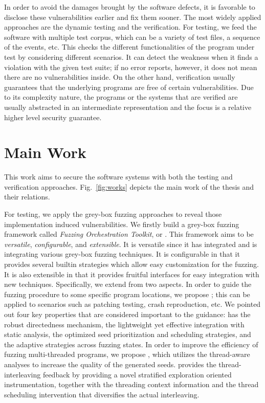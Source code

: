 In order to avoid the damages brought by the software defects, it is favorable to disclose these vulnerabilities earlier and fix them sooner. The most widely applied approaches are the dynamic testing and the verification. For testing, we feed the software with multiple test corpus, which can be a variety of test files, a sequence of the events, etc. This checks the different functionalities of the program under test by considering different scenarios. It can detect the weakness when it finds a violation with the given test suite; if no error reports, however, it does not mean there are no vulnerabilities inside. On the other hand, verification usually guarantees that the underlying programs are free of certain vulnerabilities. Due to its complexity nature, the programs or the systems that are verified are usually abstracted in an intermediate representation and the focus is a relative higher level security guarantee.

\section{Main Work}

This work aims to secure the software systems with both the testing and verification approaches. Fig.~\ref{fig:works} depicts the main work of the thesis and their relations.

For testing, we apply the grey-box fuzzing approaches to reveal those implementation induced vulnerabilities. We firstly build a grey-box fuzzing framework called \emph{Fuzzing Orchestration Toolkit}, or \FOT. This framework aims to be \emph{versatile}, \emph{configurable}, and \emph{extensible}. It is versatile since it has integrated and is integrating various grey-box fuzzing techniques. It is configurable in that it provides several builtin strategies which allow easy customization for the fuzzing. It is also extensible in that it provides fruitful interfaces for easy integration with new techniques. Specifically, we extend \FOT from two aspects. In order to guide the fuzzing procedure to some specific program locations, we propose \dFOT; this can be applied to scenarios such as patching testing, crash reproduction, etc. We pointed out four key properties that are considered important to the guidance: \dFOT has the robust directedness mechanism, the lightweight yet effective integration with static analysis, the optimized seed prioritization and scheduling strategies, and the adaptive strategies across fuzzing states. In order to improve the efficiency of fuzzing multi-threaded programs, we propose \mtfuzz, which utilizes the thread-aware analyses to increase the quality of the generated seeds. \mtfuzz provides the thread-interleaving feedback by providing a novel stratified exploration oriented instrumentation, together with the threading context information and the thread scheduling intervention that diversifies the actual interleaving.

